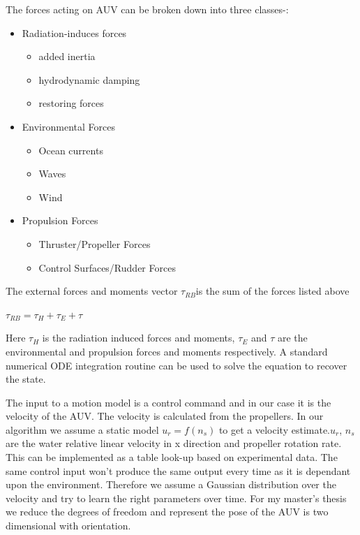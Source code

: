 \documentclass[12pt]{dalcsthesis}
\begin{document}
The forces acting on AUV can be broken down into three classes-:
\begin{itemize}
\item Radiation-induces forces

\begin{itemize}
\item added inertia
\item hydrodynamic damping
\item restoring forces
\end{itemize}
\item Environmental Forces

\begin{itemize}
\item Ocean currents
\item Waves
\item Wind
\end{itemize}
\item Propulsion Forces

\begin{itemize}
\item Thruster/Propeller Forces
\item Control Surfaces/Rudder Forces
\end{itemize}
\end{itemize}
The external forces and moments vector $\tau_{RB}$is the sum of the
forces listed above 

$\tau_{RB}=\tau_{H}+\tau_{E}+\tau$

Here $\tau_{H}$ is the radiation induced forces and moments, $\tau_{E}$
and $\tau$ are the environmental and propulsion forces and moments respectively. 
A standard numerical ODE integration routine can be used to solve the equation to recover the state.

The input to a motion model is a control command and in our case it is the velocity of the AUV. The velocity is calculated from the propellers. In our algorithm we assume a static model $u_{r}=f(n_{s})$ to get a velocity estimate.$u_{r}$, $n_{s}$ are the water relative linear velocity in x direction and propeller rotation rate. This can be implemented as a table look-up based on experimental data.
The same control input won't produce the same output every time as it is dependant upon the environment. Therefore we assume a Gaussian distribution over the velocity and try to learn the right parameters over time. 
For my master's thesis we reduce the degrees of freedom and represent the pose of the AUV is two dimensional with orientation. 
\end{document}
